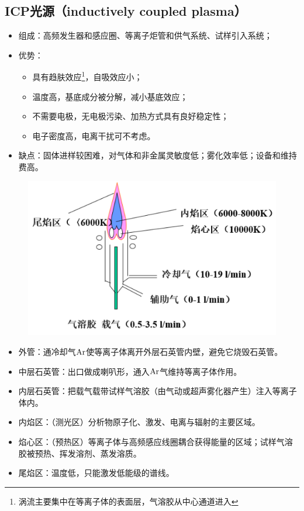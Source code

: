 \subsection{ICP光源（inductively coupled plasma）}
\begin{itemize}
	\item 组成：高频发生器和感应圈、等离子炬管和供气系统、试样引入系统；
	\item 优势：
	\begin{itemize}
		\item 具有趋肤效应\footnote{涡流主要集中在等离子体的表面层，气溶胶从中心通道进入}，自吸效应小；
		\item 温度高，基底成分被分解，减小基底效应；
		\item 不需要电极，无电极污染、加热方式具有良好稳定性；
		\item 电子密度高，电离干扰可不考虑。
	\end{itemize}
	\item 缺点：固体进样较困难，对气体和非金属灵敏度低；雾化效率低；设备和维持费高。
\end{itemize}

\begin{figure}[!h]
	\centering
	\includegraphics[width=0.7\linewidth]{image/chp8_ICP}
	\label{fig:chp8icp}
\end{figure}

\begin{itemize}
	\item 外管：通冷却气$\ce{Ar}$使等离子体离开外层石英管内壁，避免它烧毁石英管。
	\item 中层石英管：出口做成喇叭形，通入$\ce{Ar}$气维持等离子体作用。
	\item 内层石英管：把载气载带试样气溶胶（由气动或超声雾化器产生）注入等离子体内。
	\item 内焰区：（测光区）分析物原子化、激发、电离与辐射的主要区域。
	\item 焰心区：（预热区）等离子体与高频感应线圈耦合获得能量的区域；试样气溶胶被预热、挥发溶剂、蒸发溶质。
	\item 尾焰区：温度低，只能激发低能级的谱线。
\end{itemize}


